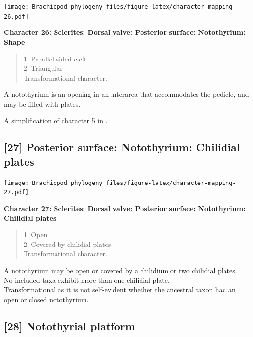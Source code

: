 \documentclass[openany]{book}
\theoremstyle{definition}
\theoremstyle{definition}
\theoremstyle{definition}
\theoremstyle{remark}
\begin{document}
\texttt{[image: Brachiopod\_phylogeny\_files/figure-latex/character-mapping-26.pdf]}

\textbf{Character 26: Sclerites: Dorsal valve: Posterior surface:
Notothyrium: Shape}

\begin{quote}
1: Parallel-sided cleft\\
2: Triangular\\
Transformational character.
\end{quote}

A notothyrium is an opening in an interarea that accommodates the
pedicle, and may be filled with plates.

A simplification of character 5 in
\citet{Bassett2001Functionalmorphology}.

\hypertarget{posterior-surface-notothyrium-chilidial-plates}{%
\subsection*{{[}27{]} Posterior surface: Notothyrium: Chilidial
plates}\label{posterior-surface-notothyrium-chilidial-plates}}

\texttt{[image: Brachiopod\_phylogeny\_files/figure-latex/character-mapping-27.pdf]}

\textbf{Character 27: Sclerites: Dorsal valve: Posterior surface:
Notothyrium: Chilidial plates}

\begin{quote}
1: Open\\
2: Covered by chilidial plates\\
Transformational character.
\end{quote}

A notothyrium may be open or covered by a chilidium or two chilidial
plates.\\
No included taxa exhibit more than one chilidial plate.\\
Transformational as it is not self-evident whether the ancestral taxon
had an open or closed notothyrium.

\hypertarget{notothyrial-platform}{%
\subsection*{{[}28{]} Notothyrial platform}\label{notothyrial-platform}}
\end{document}

